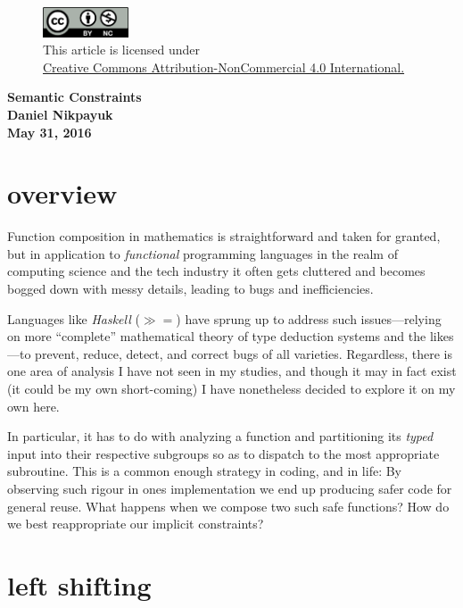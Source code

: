 \documentclass[twoside]{article}
\begin{document}
\begin{figure}[h]
\centering
\includegraphics[width=1in]{cc-by-nc.png}\\[0.1in]
\tiny This article is licensed under \\
\href{http://creativecommons.org/licenses/by-nc/4.0/}
{Creative Commons Attribution-NonCommercial 4.0 International.}\\[0.3in]
\end{figure}

\begin{center}
\bfseries\Large Semantic Constraints\\ \normalsize Daniel Nikpayuk \\ May 31, 2016
\end{center}

\section*{overview}

Function composition in mathematics is straightforward and taken for granted, but in application
to \emph{functional} programming languages in the realm of computing science and the tech industry
it often gets cluttered and becomes bogged down with messy details, leading to bugs and inefficiencies.

Languages like \emph{Haskell} ($ \gg = $) have sprung up to address such issues---relying on more ``complete''
mathematical theory of type deduction systems and the likes---to prevent, reduce, detect, and correct bugs of
all varieties.  Regardless, there is one area of analysis I have not seen in my studies, and though it may in
fact exist (it could be my own short-coming) I have nonetheless decided to explore it on my own here.

In particular, it has to do with analyzing a function and partitioning its \emph{typed} input into their
respective subgroups so as to dispatch to the most appropriate subroutine. This is a common enough strategy
in coding, and in life: By observing such rigour in ones implementation we end up producing safer code for general
reuse. What happens when we compose two such safe functions? How do we best reappropriate our implicit constraints?

\section*{left shifting}
\end{document}
